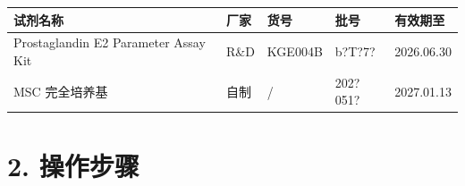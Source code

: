 \documentclass[UTF8,10pt,a4paper,fontset=fandol]{ctexart}
\newcommand{\fieldvalue}[1]{#1}
\newcommand{\handwritten}[1]{#1}
\begin{document}
\begin{tabular}{|p{4.5cm}|p{1.4cm}|p{1.8cm}|p{2.0cm}|p{2.2cm}|}
\hline
试剂名称 & 厂家 & 货号 & 批号 & 有效期至 \\
\hline
Prostaglandin E2 Parameter Assay Kit &
\fieldvalue{R\&D} &
\fieldvalue{KGE004B} &
\fieldvalue{\handwritten{b?T?7?}} &
\fieldvalue{\handwritten{2026.06.30}} \\
\hline
MSC 完全培养基 &
\fieldvalue{自制} &
\fieldvalue{/} &
\fieldvalue{\handwritten{202?051?}} &
\fieldvalue{\handwritten{2027.01.13}} \\
\hline
\end{tabular}

\section*{2. 操作步骤}
\end{document}
